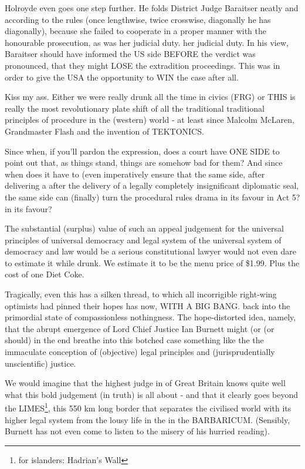 \begin{multicols}{2}
Holroyde even goes one step further. He folds
District Judge Baraitser neatly and according to the rules
(once lengthwise, twice crosswise, diagonally he has
diagonally), because she failed to cooperate in a proper manner with the honourable prosecution, as was her judicial duty.
her judicial duty. In his view, Baraitser should have informed the US side BEFORE the verdict was pronounced,
that they might LOSE the extradition proceedings. This was in order to give the USA the opportunity to WIN the case after all.

Kiss my ass. Either we were really drunk all the time in civics (FRG) or THIS
is really the most revolutionary plate shift of all the traditional
traditional principles of procedure in the (western) world
- at least since Malcolm McLaren, Grandmaster Flash
and the invention of TEKTONICS.

Since when, if you'll pardon the expression, does a court have ONE SIDE
to point out that, as things stand, things are somehow bad for them? And since when does it have to (even
imperatively ensure that the same side, after delivering a
after the delivery of a legally completely insignificant
diplomatic seal, the same side can (finally) turn the procedural rules drama in its favour in Act 5?
in its favour?

The substantial (surplus) value of such an appeal judgement for the universal principles of universal democracy and legal system
of the universal system of democracy and law would be
a serious constitutional lawyer would not even dare to estimate it while drunk. We estimate it to be the menu price of \$1.99. Plus the cost of one
Diet Coke.

Tragically, even this has a silken thread,
to which all incorrigible right-wing optimists had pinned their hopes has now, WITH A BIG BANG.
back into the primordial state of compassionless nothingness. The hope-distorted idea, namely, that the abrupt emergence of Lord Chief Justice Ian Burnett might (or
(or should) in the end breathe into this botched case something like the
the immaculate conception of (objective) legal principles and (jurisprudentially unscientific) justice.

We would imagine that the highest judge in
of Great Britain knows quite well what this bold judgement (in truth) is all about - and
that it clearly goes beyond the LIMES\footnote[33]{for islanders: Hadrian's Wall}, this 550
km long border that separates the civilised world with its higher legal system from the lousy life in the
in the BARBARICUM. (Sensibly, Burnett
has not even come to listen to the misery of his
hurried reading).


\end{multicols}
